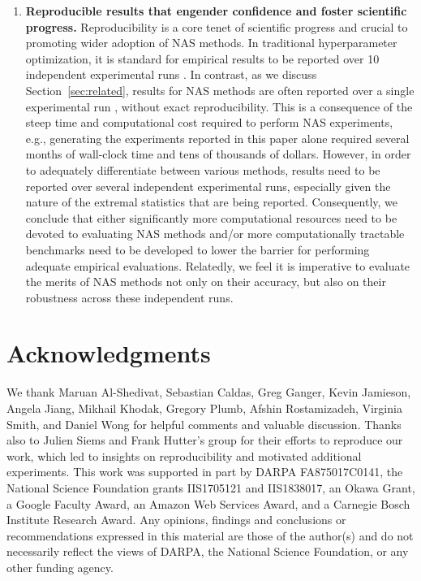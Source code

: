 \documentclass[acmlarge, nonacm]{acmart}
\begin{document}
\begin{enumerate}
    \item \textbf{Reproducible results that engender confidence and foster  scientific progress.} Reproducibility is a core tenet of scientific progress and crucial to promoting wider adoption of NAS methods. In traditional hyperparameter optimization, it is standard for empirical results to be reported over 10 independent experimental runs \citep{feurer2015efficient,fabolas2016,kandasamy2017cont,hyperband}.  In contrast, as we discuss Section~\ref{sec:related}, results for NAS methods are often reported over a single experimental run \citep{pham18ENAS,cai2018proxylessnas,xie2018snas,zhang2018graph}, without exact reproducibility.  This is a consequence of the steep time and computational cost required to perform NAS experiments, e.g., generating the experiments reported in this paper alone required several months of wall-clock time and tens of thousands of dollars. However, in order to adequately differentiate between various methods, results need to be reported over several independent experimental runs, especially given the nature of the extremal statistics that are being reported. Consequently, we conclude that either significantly more computational resources need to be devoted to evaluating NAS methods and/or more computationally tractable benchmarks need to be developed to lower the barrier for performing adequate empirical evaluations.  Relatedly, we feel it is imperative to evaluate the merits of NAS methods not only on their accuracy, but also on their robustness across these independent runs.
    
\end{enumerate}



 \section*{Acknowledgments}
 We thank Maruan Al-Shedivat, Sebastian Caldas, Greg Ganger, Kevin Jamieson, Angela Jiang, Mikhail Khodak, Gregory Plumb, Afshin Rostamizadeh, Virginia Smith, and Daniel Wong for helpful comments and valuable discussion.  
Thanks also to Julien Siems and Frank Hutter's group for their efforts to reproduce our work, which led to insights on reproducibility and motivated additional experiments.
This work was supported in part by DARPA FA875017C0141, the National Science Foundation grants IIS1705121 and IIS1838017, an Okawa Grant, a Google Faculty Award, an Amazon Web Services Award, and a Carnegie Bosch Institute Research Award. Any opinions, findings and conclusions or recommendations expressed in this material are those of the author(s) and do not necessarily reflect the views of DARPA, the National Science Foundation, or any other funding agency.
 
\end{document}
